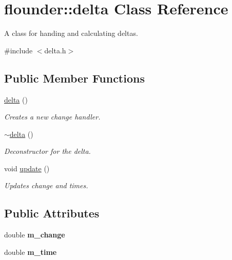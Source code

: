 \hypertarget{classflounder_1_1delta}{}\section{flounder\+:\+:delta Class Reference}
\label{classflounder_1_1delta}


A class for handing and calculating deltas.  




{\ttfamily \#include $<$delta.\+h$>$}

\subsection*{Public Member Functions}
\begin{DoxyCompactItemize}
\item 
\hyperlink{classflounder_1_1delta_a6996799d2f9423e994e2beb84dc3ba09}{delta} ()
\begin{DoxyCompactList}\small\item\em Creates a new change handler. \end{DoxyCompactList}\item 
\hyperlink{classflounder_1_1delta_af9eb174b15b3730a45a903e988dac1e8}{$\sim$delta} ()
\begin{DoxyCompactList}\small\item\em Deconstructor for the delta. \end{DoxyCompactList}\item 
void \hyperlink{classflounder_1_1delta_a6f87fd0b76d229ec490a07a565c2afd0}{update} ()
\begin{DoxyCompactList}\small\item\em Updates change and times. \end{DoxyCompactList}\end{DoxyCompactItemize}
\subsection*{Public Attributes}
\begin{DoxyCompactItemize}
\item 
\mbox{\label{classflounder_1_1delta_ad2cf30b37da5d4fd9b6a0871f59838fc}} 
double {\bfseries m\+\_\+change}
\item 
\mbox{\label{classflounder_1_1delta_abace656b4a93f9b24b1c9000e3c441ee}} 
double {\bfseries m\+\_\+time}
\end{DoxyCompactItemize}
